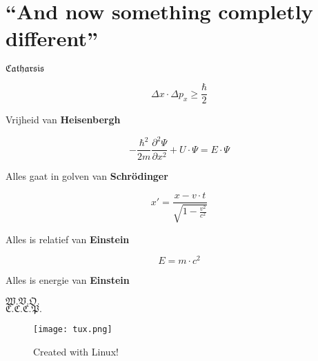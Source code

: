 \documentclass[a4paper,titlepage]{article}
\begin{document}
\section*{``And now something completly different''}
\begin{centering}
$\mathfrak{Catharsis}$
\end{centering}
\[
\Delta x\cdot\Delta p_x\geq\displaystyle\frac{\hbar}{2}
\]
\begin{flushright}
Vrijheid van \textbf{Heisenbergh}
\end{flushright}
\[
-\displaystyle\frac{\hbar^2}{2m}\displaystyle\frac{\partial^2\Psi}{\partial x^2}+U\cdot\Psi=E\cdot\Psi
\]
\begin{flushright}
Alles gaat in golven van \textbf{Schr\"odinger}
\end{flushright}
\[
x'=\displaystyle\frac{x-v\cdot t}{\sqrt{1-\displaystyle\frac{v^2}{c^2}}}
\]
\begin{flushright}
Alles is relatief van \textbf{Einstein}
\end{flushright}
\[
E=m\cdot c^2
\]
\begin{flushright}
Alles is energie van \textbf{Einstein}
\end{flushright}
$\mathfrak{W.V.O.}$\\%
$\mathfrak{C.C.C.P.}$%
\begin{figure*}[b]
\centering
\texttt{[image: tux.png]}
\caption{Created with Linux!}
\end{figure*}
\end{document}
